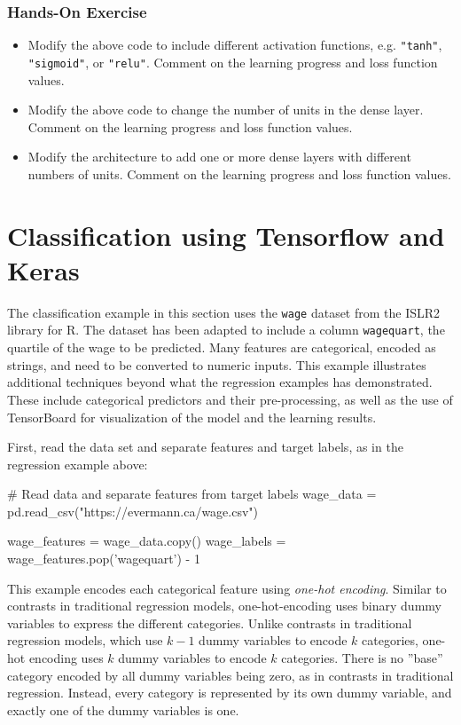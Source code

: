 \begin{tcolorbox}[colback=code]
\subsubsection*{Hands-On Exercise} 
\begin{itemize}
  \item Modify the above code to include different activation functions, e.g. \texttt{"tanh"}, \texttt{"sigmoid"}, or \texttt{"relu"}. Comment on the learning progress and loss function values.
  \item Modify the above code to change the number of units in the dense layer. Comment on the learning progress and loss function values.
  \item Modify the architecture to add one or more dense layers with different numbers of units. Comment on the learning progress and loss function values.
\end{itemize}
\end{tcolorbox}

\section{Classification using Tensorflow and Keras}

The classification example in this section uses the \texttt{wage} dataset from the ISLR2 library for R. The dataset has been adapted to include a column \texttt{wagequart}, the quartile of the wage to be predicted. Many features are categorical, encoded as strings, and need to be converted to numeric inputs. This example illustrates additional techniques beyond what the regression examples has demonstrated. These include categorical predictors and their pre-processing, as well as the use of TensorBoard for visualization of the model and the learning results.

First, read the data set and separate features and target labels, as in the regression example above:

\begin{samepage}
\begin{pythoncode}
# Read data and separate features from target labels
wage_data = pd.read_csv("https://evermann.ca/wage.csv")
    
wage_features = wage_data.copy()
wage_labels = wage_features.pop('wagequart') - 1
\end{pythoncode}
\end{samepage}

This example encodes each categorical feature using \emph{one-hot encoding}. Similar to contrasts in traditional regression models, one-hot-encoding uses binary dummy variables to express the different categories. Unlike contrasts in traditional regression models, which use $k-1$ dummy variables to encode $k$ categories, one-hot encoding uses $k$ dummy variables to encode $k$ categories. There is no ''base'' category encoded by all dummy variables being zero, as in contrasts in traditional regression. Instead, every category is represented by its own dummy variable, and exactly one of the dummy variables is one. 

